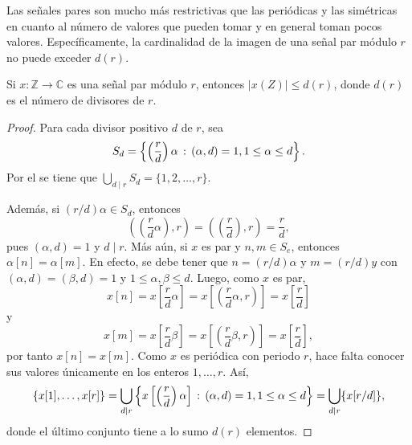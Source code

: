 Las señales pares son mucho más restrictivas que las periódicas y las simétricas en cuanto al número de valores que pueden tomar y en general toman pocos valores. Específicamente, la cardinalidad de la imagen de una señal par módulo $r$ no puede exceder $d(r)$.

\begin{proposition}\label{prop:fou3}
Si $x : \mathbb{Z} \longrightarrow \mathbb{C}$ es una señal par módulo $r$, entonces $| x (Z) | \le d(r)$, donde $d(r)$ es el número de divisores de $r$.
\end{proposition}

\begin{proof}
Para cada divisor positivo $d$ de $r$, sea
\begin{equation*}
    S_d = \left\{ \left( \frac{r}{d} \right) \alpha \, : \, (\alpha,d) = 1, 1 \le \alpha \le d \right\}.
\end{equation*}
Por el  se tiene que $\bigcup_{d \mid r} S_d = \{ 1,2,\ldots,r \}$.
\bigskip

Además, si $(r/d)\alpha \in S_d$, entonces
\begin{equation}\label{eq:res1}
    \left( \left( \frac{r}{d} \alpha \right),r \right) = \left( \left( \frac{r}{d} \right),r \right) = \frac{r}{d},
\end{equation}
pues $(\alpha,d)=1$ y $d \mid r$. Más aún, si $x$ es par y $n, m \in S_e$, entonces $\alpha[n]=\alpha[m]$. En efecto, se debe tener que $n = (r/d) \alpha$ y $m = (r/d) y$ con $(\alpha,d)=(\beta,d)=1$ y $1 \le \alpha,\beta \le d$. Luego, como $x$ es par,
\begin{equation*}
    x[n] = x \left[ \frac{r}{d} \alpha \right] = x \left[ \left( \frac{r}{d} \alpha, r \right) \right] = x \left[ \frac{r}{d} \right]
\end{equation*}
y
\begin{equation*}
    x[m] = x \left[ \frac{r}{d} \beta \right] = x \left[ \left( \frac{r}{d} \beta, r \right) \right] = x \left[ \frac{r}{d} \right],
\end{equation*}
por tanto $x[n]=x[m]$. Como $x$ es periódica con periodo $r$, hace falta conocer sus valores únicamente en los enteros $1,\ldots,r$. Así,
\begin{equation*}
    \{ x[1], \ldots, x[r] \} = \bigcup_{d \mid r} \left\{ x \left [\left( \frac{r}{d} \right) \alpha \right] \, : \, (\alpha,d)=1, 1 \le \alpha \le d \right\} = \bigcup_{d \mid r} \{ x[r/d] \},
\end{equation*}
donde el último conjunto tiene a lo sumo $d(r)$ elementos.
\end{proof}

